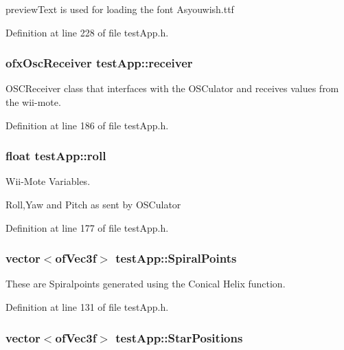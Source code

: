 preview\-Text is used for loading the font Asyouwish.\-ttf 



Definition at line 228 of file test\-App.\-h.

\hypertarget{classtest_app_a034c44ff60fa1e5f021e90d5410ba657}{
\subsubsection[{receiver}]{\setlength{\rightskip}{0pt plus 5cm}ofx\-Osc\-Receiver test\-App\-::receiver}}\label{classtest_app_a034c44ff60fa1e5f021e90d5410ba657}


O\-S\-C\-Receiver class that interfaces with the O\-S\-Culator and receives values from the wii-\/mote. 



Definition at line 186 of file test\-App.\-h.

\hypertarget{classtest_app_a020730abb55e6ae6d0a28edee19050e0}{
\subsubsection[{roll}]{\setlength{\rightskip}{0pt plus 5cm}float test\-App\-::roll}}\label{classtest_app_a020730abb55e6ae6d0a28edee19050e0}


Wii-\/\-Mote Variables. 

Roll,Yaw and Pitch as sent by O\-S\-Culator 

Definition at line 177 of file test\-App.\-h.

\hypertarget{classtest_app_af0dd2f3e3aabdb43bee49d74c156dc05}{
\subsubsection[{Spiral\-Points}]{\setlength{\rightskip}{0pt plus 5cm}vector$<$of\-Vec3f$>$ test\-App\-::\-Spiral\-Points}}\label{classtest_app_af0dd2f3e3aabdb43bee49d74c156dc05}


These are Spiralpoints generated using the Conical Helix function. 



Definition at line 131 of file test\-App.\-h.

\hypertarget{classtest_app_a68d0d30cea64a9d39a1b2deef16677ad}{
\subsubsection[{Star\-Positions}]{\setlength{\rightskip}{0pt plus 5cm}vector$<$of\-Vec3f$>$ test\-App\-::\-Star\-Positions}}\label{classtest_app_a68d0d30cea64a9d39a1b2deef16677ad}


